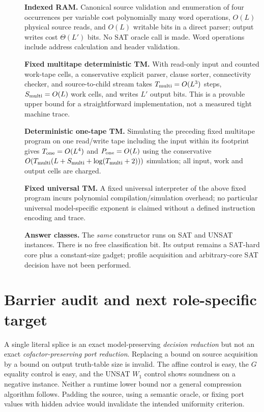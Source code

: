 \documentclass[11pt]{article}
\begin{document}
\begin{description}
\item[]\textbf{Indexed RAM.} Canonical source validation and enumeration of four occurrences per variable cost polynomially many word operations, $O(L)$ physical source reads, and $O(L)$ writable bits in a direct parser; output writes cost $\Theta(L')$ bits. No SAT oracle call is made. Word operations include address calculation and header validation.
\item[]\textbf{Fixed multitape deterministic TM.} With read-only input and counted work-tape cells, a conservative explicit parser, clause sorter, connectivity checker, and source-to-child stream takes $T_{\rm multi}=O(L^3)$ steps, $S_{\rm multi}=O(L)$ work cells, and writes $L'$ output bits. This is a provable upper bound for a straightforward implementation, not a measured tight machine trace.
\item[]\textbf{Deterministic one-tape TM.} Simulating the preceding fixed multitape program on one read/write tape including the input within its footprint gives $T_{\rm one}=O(L^4)$ and $P_{\rm one}=O(L)$ using the conservative $O(T_{\rm multi}(L+S_{\rm multi}+\log(T_{\rm multi}+2)))$ simulation; all input, work and output cells are charged.
\item[]\textbf{Fixed universal TM.} A fixed universal interpreter of the above fixed program incurs polynomial compilation/simulation overhead; no particular universal model-specific exponent is claimed without a defined instruction encoding and trace.
\item[]\textbf{Answer classes.} The \emph{same} constructor runs on SAT and UNSAT instances. There is no free classification bit. Its output remains a SAT-hard core plus a constant-size gadget; profile acquisition and arbitrary-core SAT decision have not been performed.
\end{description}

\section{Barrier audit and next role-specific target}
A single literal splice is an exact model-preserving \emph{decision reduction} but not an exact \emph{cofactor-preserving port reduction}. Replacing a bound on source acquisition by a bound on output truth-table size is invalid. The affine control is easy, the $G$ equality control is easy, and the UNSAT $W_1$ control shows soundness on a negative instance. Neither a runtime lower bound nor a general compression algorithm follows. Padding the source, using a semantic oracle, or fixing port values with hidden advice would invalidate the intended uniformity criterion.
\end{document}
